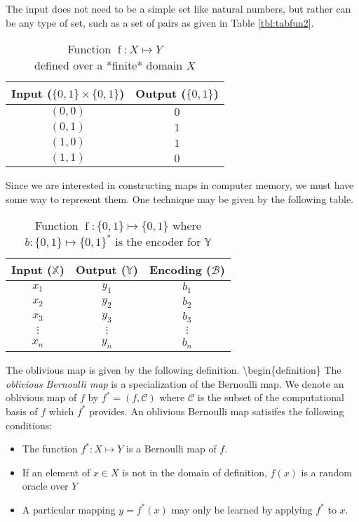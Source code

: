 \documentclass[
]{article}
\theoremstyle{definition}
\theoremstyle{definition}
\theoremstyle{definition}
\theoremstyle{definition}
\theoremstyle{remark}
\begin{document}
The input does not need to be a simple set like natural numbers, but rather can be any type of set, such as a set of pairs as given in Table \ref{tbl:tabfun2}.

\begin{table}
\centering
\caption{Function $\operatorname{f} \colon X \mapsto Y$\\defined over a *finite* domain $X$}
\label{tbl:tabfunc2}
\begin{tabular}{|c c|} 
\hline
Input ($\{0,1\} \times \{0,1\}$) & Output ($\{0,1\}$)\\
\hline
    $(0,0)$ & $0$\\
    $(0,1)$ & $1$\\
    $(1,0)$ & $1$\\
    $(1,1)$ & $0$\\    
\hline
\end{tabular}
\end{table}

Since we are interested in constructing maps in computer memory, we must have some way to represent them.
One technique may be given by the following table.

\begin{table}
\centering
\caption{Function $\operatorname{f} \colon \{0,1\} \mapsto \{0,1\}$ where $b : \{0,1\} \mapsto \{0,1\}^*$ is the encoder for $\mathbb{Y}$}
\label{tbl:tabfunc}
\begin{tabular}{|c c c|} 
\hline
Input ($\mathbb{X}$) & Output ($\mathbb{Y}$) & Encoding ($\mathcal{B}$)\\
\hline
    $x_1$ & $y_1$ & $b_1$\\
    $x_2$ & $y_2$ & $b_2$\\
    $x_3$ & $y_3$ & $b_3$\\
    $\vdots$ & $\vdots$ & $\vdots$\\
    $x_n$ & $y_n$ & $b_n$\\
\hline
\end{tabular}
\end{table}

The oblivious map is given by the following definition.
\textbackslash begin\{definition\}
The \emph{oblivious Bernoulli map} is a specialization of the Bernoulli map. We
denote an oblivious map of \(f\) by \(f^* = (f,\mathcal{C})\) where \(\mathcal{C}\) is the
subset of the computational basis of \(f\) which \(f^*\) provides.
An oblivious Bernoulli map satisifes the following conditions:

\begin{itemize}
\item
  The function \(f^* : X \mapsto Y\) is a Bernoulli map of \(f\).
\item
  If an element of \(x \in X\) is not in the domain of definition,
  \(f(x)\) is a random oracle over \(Y\)
\item
  A particular mapping \(y = f^*(x)\) may only be learned by applying \(f^*\) to \(x\).
\end{itemize}
\end{document}
